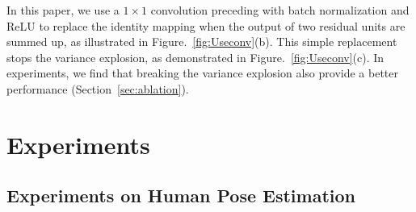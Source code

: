 \documentclass[10pt,twocolumn,letterpaper]{article}
\begin{document}
In this paper, we use a $1\times 1$ convolution preceding with batch normalization and ReLU to replace the identity mapping when the output of two residual units are summed up, as illustrated in Figure.~\ref{fig:Useconv}(b).  
This simple replacement stops the variance explosion, as demonstrated in Figure.~\ref{fig:Useconv}(c). 
In experiments, we find that breaking the variance explosion also provide a better performance (Section~\ref{sec:ablation}).


\section{Experiments}

\subsection{Experiments on Human Pose Estimation}
\end{document}
